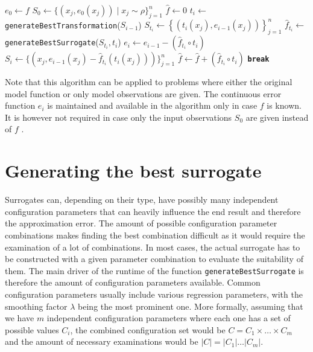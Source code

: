 \documentclass[
  a4paper,  %
  twoside,  %
  bibliography=totoc,
  headsepline,
  cleardoublepage=empty,
  parskip=half,
  draft=false
]{scrbook}
\begin{document}
\newpage
\begin{mdframed}[style=algstyle,frametitle={\textbf{function} \texttt{transformedSurrogateSum}{($f, n$)}}]
\normalsize
\vspace{5.5mm}
\begin{algorithmic}[1]
    \State $e_0 \gets f$
    \State $S_0 \gets \{\left(x_j, e_0(x_j)\right) \mid x_j \sim \rho \}_{j=1}^n$
    \State $\hat{f} \gets 0$
    	\State $t_i \gets$ \texttt{generateBestTransformation}($S_{i - 1}$)
    	\State $S_{t_i} \gets \left\{\left(t_i(x_j), e_{i - 1}(x_j)\right)\right\}_{j=1}^n$
    	\State $\hat{f}_{t_i} \gets$ \texttt{generateBestSurrogate}($S_{t_i}, t_i$)
    	\State $e_i \gets e_{i - 1} - \left(\hat{f}_{t_i} \circ t_i\right)$
    	\State $S_i \gets \{\left(x_j, e_{i - 1}(x_j) - \hat{f}_{t_i}\left(t_i(x_j)\right)\right)\}_{j=1}^n$
    	\State $\hat{f} \gets \hat{f} + \left(\hat{f}_{t_i} \circ t_i\right)$
    		\State  \textbf{\texttt{break}}
    	\EndIf
    \EndFor
    \State {}
\end{algorithmic}
\vspace{-1.5mm}
\delimit
	\label{alg:itappr}
\end{mdframed}
%
Note that this algorithm can be applied to problems where either the original model function or only model observations are given.
The continuous error function $e_i$ is maintained and available in the algorithm only in case $f$ is known.
It is however not required in case only the input observations $S_0$ are given instead of $f$ .

\section{Generating the best surrogate}
\label{sec:gs}

Surrogates can, depending on their type, have possibly many independent configuration parameters that can heavily influence the end result and therefore the approximation error.
The amount of possible configuration parameter combinations makes finding the best combination difficult as it would require the examination of a lot of combinations.
In most cases, the actual surrogate has to be constructed with a given parameter combination to evaluate the suitability of them.
The main driver of the runtime of the function \texttt{generateBestSurrogate} is therefore the amount of configuration parameters available.
Common configuration parameters usually include various regression parameters, with the smoothing factor $\lambda$ being the most prominent one.
More formally, assuming that we have $m$ independent configuration parameters where each one has a set of possible values $C_i$, the combined configuration set would be $C=C_1 \times \dots \times C_m$ and the amount of necessary examinations would be $|C|=|C_1| \dots |C_m|$.
\end{document}
